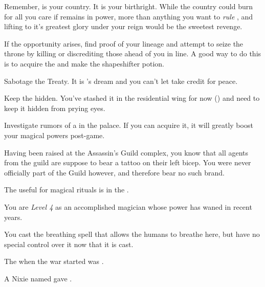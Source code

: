 \documentclass[char]{NeptuneBall}
\begin{document}
Remember, \pAtlantis{} is your country. It is your birthright. While the country could burn for all you care if \cKing{} remains in power, more than anything you want to \emph{rule} \pAtlantis{}, and lifting \pAtlantis{} to it's greatest glory under your reign would be the sweetest revenge.

\begin{itemz}[Goals]
  \item If the opportunity arises, find proof of your lineage and attempt to seize the throne by killing or discrediting those ahead of you in line. A good way to do this is to acquire the \iHemlock{} and make the shapeshifter potion.
  \item Sabotage the Treaty. It is \cKing{}'s dream and you can't let \cKing{\them} take credit for peace.
  \item Keep the \iMusicBox{} hidden. You've stashed it in the residential wing for now (\sPacketA{\MYloc}) and need to keep it hidden from prying eyes.
  \item Investigate rumors of a \iGlowShell{} in the palace. If you can acquire it, it will greatly boost your magical powers post-game.
\end{itemz}

\begin{itemz}[Notes]
  \item Having been raised at the Assassin's Guild complex, you know that all agents from the guild are suppose to bear a tattoo on their left bicep. You were never officially part of the Guild however, and therefore bear no such brand.
	\item The \sRunicCircle{} useful for magical rituals is in the \pCaves{\MYname}.
	\item You are \emph{Level 4} as an accomplished magician whose power has waned in recent years.
  \item You cast the breathing spell that allows the humans to breathe here, but have no special control over it now that it is cast.
\end{itemz}

\begin{itemz}[Trivia]
  \item The \cExExKing{\King} when the war started was \cExExKing{}.
	\item A Nixie named \cNixie{} gave \cExKing{} \iTrident{\MYname}.
\end{itemz}
\end{document}
